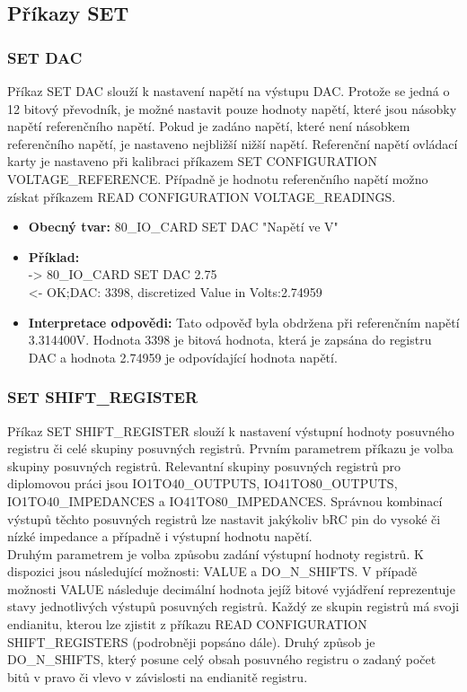 \subsection{Příkazy SET}
\subsubsection{SET DAC}
Příkaz SET DAC slouží k nastavení napětí na výstupu DAC. Protože se jedná o 12 bitový převodník, je možné nastavit pouze hodnoty napětí, které jsou násobky
napětí referenčního napětí. Pokud je zadáno napětí, které není násobkem referenčního napětí, je nastaveno nejbližší nižší napětí.
Referenční napětí ovládací karty je nastaveno při kalibraci příkazem SET CONFIGURATION VOLTAGE\_REFERENCE. Případně je hodnotu referenčního napětí možno získat
příkazem READ CONFIGURATION VOLTAGE\_READINGS.
\begin{itemize}[leftmargin=*]
    \item \textbf{Obecný tvar:} 80\_IO\_CARD SET DAC "Napětí ve V"
    \item \textbf{Příklad:}\\
    -> 80\_IO\_CARD SET DAC 2.75\\
    <- OK;DAC: 3398, discretized Value in Volts:2.74959
    \item \textbf{Interpretace odpovědi:} Tato odpověď byla obdržena při referenčním napětí 3.314400V. Hodnota 3398 je bitová hodnota, která je zapsána do registru DAC a
    hodnota 2.74959 je odpovídající hodnota napětí.
\end{itemize}

\subsubsection{SET SHIFT\_REGISTER}
Příkaz SET SHIFT\_REGISTER slouží k nastavení výstupní hodnoty posuvného registru či celé skupiny posuvných registrů.
Prvním parametrem příkazu je volba skupiny posuvných registrů.
Relevantní skupiny posuvných registrů pro diplomovou práci jsou IO1TO40\_OUTPUTS, IO41TO80\_OUTPUTS, IO1TO40\_IMPEDANCES a IO41TO80\_IMPEDANCES.
Správnou kombinací výstupů těchto posuvných registrů lze nastavit jakýkoliv bRC pin do vysoké či nízké impedance a případně i výstupní hodnotu napětí.\\

Druhým parametrem je volba způsobu zadání výstupní hodnoty registrů. K dispozici jsou následující možnosti: VALUE a DO\_N\_SHIFTS.
V případě možnosti VALUE následuje decimální hodnota jejíž bitové vyjádření reprezentuje stavy jednotlivých výstupů posuvných registrů.
Každý ze skupin registrů má svoji endianitu, kterou lze zjistit z příkazu READ CONFIGURATION SHIFT\_REGISTERS (podrobněji popsáno dále). 
Druhý způsob je DO\_N\_SHIFTS, který posune celý obsah posuvného registru o zadaný počet bitů v pravo či vlevo v závislosti na endianitě registru.

